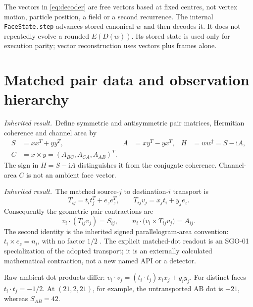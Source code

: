 \documentclass[11pt,a4paper]{article}
\newcommand{\ii}{\mathrm i}\newcommand{\tr}{\operatorname{tr}}
\newcommand{\ez}{e_z}\newcommand{\ee}{\mathbf1}
\newcommand{\inherited}{\textit{Inherited result.}}
\begin{document}
The vectors in \eqref{eq:decoder} are free vectors based at fixed centres, not vertex motion, particle position, a field or a second recurrence. The internal \texttt{FaceState.step} advances stored canonical $w$ and then decodes it. It does not repeatedly evolve a rounded $E(D(w))$. Its stored state is used only for execution parity; vector reconstruction uses vectors plus frames alone.

\clearpage
\section{Matched pair data and observation hierarchy}\label{sec:hierarchy}
\inherited\ Define symmetric and antisymmetric pair matrices, Hermitian coherence and channel area by
\begin{align}
S&=xx^T+yy^T,& A&=xy^T-yx^T,& H&=ww^\dagger=S-\ii A,\label{eq:SAH}\\
C&=x\times y=(A_{BC},A_{CA},A_{AB})^T.\label{eq:C}
\end{align}
The sign in $H=S-\ii A$ distinguishes it from the conjugate coherence. Channel-area $C$ is not an ambient face vector.

\inherited\ The matched source-$j$ to destination-$i$ transport is
\begin{equation}
T_{ij}=t_it_j^T+\ez\ez^T,\qquad T_{ij}v_j=x_jt_i+y_j\ez.\label{eq:transport}
\end{equation}
Consequently the geometric pair contractions are
\begin{equation}
v_i\cdot(T_{ij}v_j)=S_{ij},\qquad
n_i\cdot\bigl(v_i\times T_{ij}v_j\bigr)=A_{ij}.\label{eq:contractions}
\end{equation}
The second identity is the inherited signed parallelogram-area convention: $t_i\times\ez=n_i$, with no factor $1/2$ \cite{paperG}. The explicit matched-dot readout is an SGO-01 specialization of the adopted transport; it is an externally calculated mathematical contraction, not a new named API or a detector.

Raw ambient dot products differ: $v_i\cdot v_j=(t_i\cdot t_j)x_ix_j+y_iy_j$. For distinct faces $t_i\cdot t_j=-1/2$. At $(21,2,21)$, for example, the untransported AB dot is $-21$, whereas $S_{AB}=42$.
\end{document}
